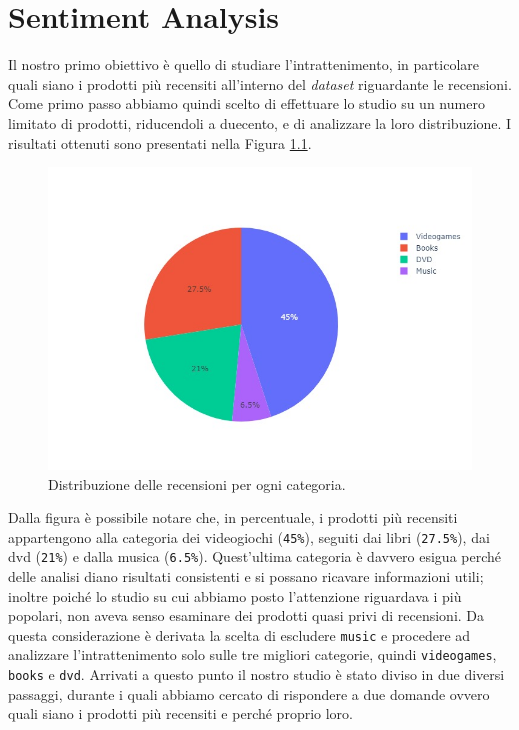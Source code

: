 \chapter{Sentiment Analysis}   
	Il nostro primo obiettivo è quello di studiare l'intrattenimento, in particolare quali siano i prodotti più recensiti all'interno del \textit{dataset} riguardante le recensioni. Come primo passo abbiamo  quindi scelto di effettuare lo studio su un numero limitato di prodotti, riducendoli a duecento, e di analizzare la loro distribuzione. I risultati ottenuti sono presentati nella Figura \ref{fig:pie_category}. 
		
	\begin{figure} [h]
		\includegraphics[width=\textwidth]{Figure/pie_category}	
		\caption{Distribuzione delle recensioni per ogni categoria.}
		\label{fig:pie_category}
	\end{figure}
	
	Dalla figura è possibile notare che, in percentuale, i prodotti più recensiti appartengono alla categoria dei videogiochi (\verb|45%|), seguiti dai libri (\verb|27.5%|), dai dvd (\verb|21%|) e dalla musica (\verb|6.5%|). Quest'ultima categoria è davvero esigua perché delle analisi diano risultati consistenti e si possano ricavare informazioni utili; inoltre poiché lo studio su cui abbiamo posto l'attenzione riguardava i più popolari, non aveva senso esaminare dei prodotti quasi privi di recensioni. Da questa considerazione è derivata la scelta di escludere \verb|music| e procedere ad analizzare l'intrattenimento solo sulle tre migliori categorie, quindi \verb|videogames|, \verb|books| e \verb|dvd|. Arrivati a questo punto il nostro studio è stato diviso in due diversi passaggi, durante i quali abbiamo cercato di rispondere a due domande ovvero quali siano i prodotti più recensiti e perché proprio loro. 
		
